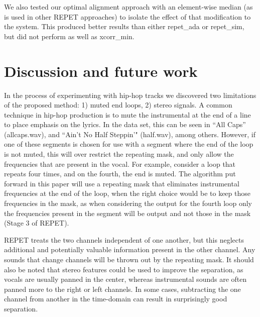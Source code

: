 \documentclass{article}
\begin{document}

We also tested our optimal alignment approach with an element-wise median (as is used in other REPET approaches) to isolate the effect of that modification to the system. This produced better results than either repet\_ada or repet\_sim, but did not perform as well as xcorr\_min. 

\section{Discussion and future work}\label{sec:limit}




In the process of experimenting with hip-hop tracks we discovered two
limitations of the proposed method: 1) muted end loops, 2) stereo
signals. A common technique in hip-hop production is to mute the
instrumental at the end of a line to place emphasis on the lyrics. In
the data set, this can be seen in ``All Caps'' (all\-caps.wav), and
``Ain't No Half Steppin'" (half.wav), among others. However, if one of
these segments is chosen for use with a segment where the end of the
loop is not muted, this will over restrict the repeating mask, and
only allow the frequencies that are present in the vocal. For example,
consider a loop that repeats four times, and on the fourth, the end is
muted. The algorithm put forward in this paper will use a repeating
mask that eliminates instrumental frequencies at the end of the loop,
when the right choice would be to keep those frequencies in the mask,
as when considering the output for the fourth loop only the
frequencies present in the segment will be output and not those in the
mask (Stage 3 of REPET).

REPET treats the two channels independent of one another, but this
neglects additional and potentially valuable information present in
the other channel. Any sounds that change channels will be thrown
out by the repeating mask. It should also be noted that stereo
features could be used to improve the separation, as vocals are
usually panned in the center, whereas instrumental sounds are often
panned more to the right or left channels. In some cases, subtracting
the one channel from another in the time-domain can result in
surprisingly good separation.
\end{document}
